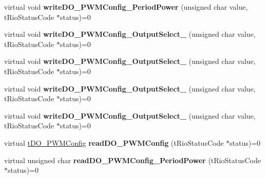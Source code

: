 \begin{DoxyCompactItemize}
\item 
\hypertarget{classnFPGA_1_1nFRC__2012__1__6__4_1_1tDIO_a0e19e3445415ca2a5e2a038e15a5e176}{
virtual void {\bfseries writeDO\_\-PWMConfig\_\-PeriodPower} (unsigned char value, tRioStatusCode $\ast$status)=0}
\label{classnFPGA_1_1nFRC__2012__1__6__4_1_1tDIO_a0e19e3445415ca2a5e2a038e15a5e176}

\item 
\hypertarget{classnFPGA_1_1nFRC__2012__1__6__4_1_1tDIO_aa6e116a4d747c69a7ee8c78128b89703}{
virtual void {\bfseries writeDO\_\-PWMConfig\_\-OutputSelect\_} (unsigned char value, tRioStatusCode $\ast$status)=0}
\label{classnFPGA_1_1nFRC__2012__1__6__4_1_1tDIO_aa6e116a4d747c69a7ee8c78128b89703}

\item 
\hypertarget{classnFPGA_1_1nFRC__2012__1__6__4_1_1tDIO_aa95a3232513f1fbb951f02067bc17737}{
virtual void {\bfseries writeDO\_\-PWMConfig\_\-OutputSelect\_} (unsigned char value, tRioStatusCode $\ast$status)=0}
\label{classnFPGA_1_1nFRC__2012__1__6__4_1_1tDIO_aa95a3232513f1fbb951f02067bc17737}

\item 
\hypertarget{classnFPGA_1_1nFRC__2012__1__6__4_1_1tDIO_a99e6baaf1f5664d7054540c598b20057}{
virtual void {\bfseries writeDO\_\-PWMConfig\_\-OutputSelect\_} (unsigned char value, tRioStatusCode $\ast$status)=0}
\label{classnFPGA_1_1nFRC__2012__1__6__4_1_1tDIO_a99e6baaf1f5664d7054540c598b20057}

\item 
\hypertarget{classnFPGA_1_1nFRC__2012__1__6__4_1_1tDIO_ab702130884ebbd5cb8028024ffa07e45}{
virtual void {\bfseries writeDO\_\-PWMConfig\_\-OutputSelect\_} (unsigned char value, tRioStatusCode $\ast$status)=0}
\label{classnFPGA_1_1nFRC__2012__1__6__4_1_1tDIO_ab702130884ebbd5cb8028024ffa07e45}

\item 
\hypertarget{classnFPGA_1_1nFRC__2012__1__6__4_1_1tDIO_a43b419eaf7d380d4c76310eadd189e6b}{
virtual \hyperlink{unionnFPGA_1_1nFRC__2012__1__6__4_1_1tDIO_1_1tDO__PWMConfig}{tDO\_\-PWMConfig} {\bfseries readDO\_\-PWMConfig} (tRioStatusCode $\ast$status)=0}
\label{classnFPGA_1_1nFRC__2012__1__6__4_1_1tDIO_a43b419eaf7d380d4c76310eadd189e6b}

\item 
\hypertarget{classnFPGA_1_1nFRC__2012__1__6__4_1_1tDIO_a56f5ca4d7f2a35940ba8a1e290e5ab1c}{
virtual unsigned char {\bfseries readDO\_\-PWMConfig\_\-PeriodPower} (tRioStatusCode $\ast$status)=0}
\label{classnFPGA_1_1nFRC__2012__1__6__4_1_1tDIO_a56f5ca4d7f2a35940ba8a1e290e5ab1c}


\end{DoxyCompactItemize}
